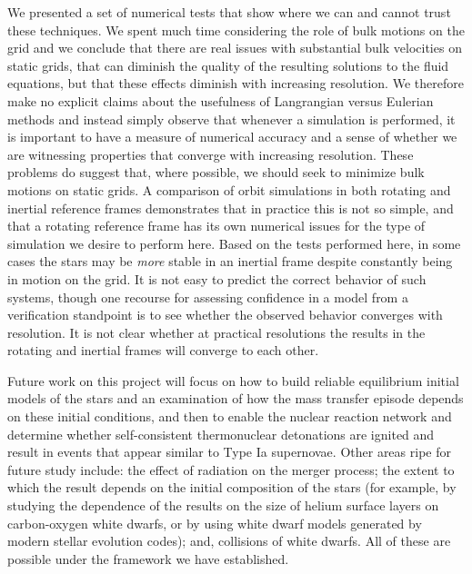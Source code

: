 \documentclass[iop]{../emulateapj}
\begin{document}
We presented a set of numerical tests that show where we can 
and cannot trust these techniques. We spent much time considering 
the role of bulk motions on the grid and we conclude that there 
are real issues with substantial bulk velocities on static grids, 
that can diminish the quality of the resulting solutions to the 
fluid equations, but that these effects diminish with increasing 
resolution. We therefore make no explicit claims about the usefulness 
of Langrangian versus Eulerian methods and instead simply observe 
that whenever a simulation is performed, it is important to have 
a measure of numerical accuracy and a sense of whether we are 
witnessing properties that converge with increasing resolution.
These problems do suggest that, where possible, we should seek to 
minimize bulk motions on static grids. A comparison of orbit 
simulations in both rotating and inertial reference frames 
demonstrates that in practice this is not so simple, and that 
a rotating reference frame has its own numerical issues for 
the type of simulation we desire to perform here. Based on 
the tests performed here, in some cases the stars may be 
\textit{more} stable in an inertial frame despite 
constantly being in motion on the grid. It 
is not easy to predict the correct behavior of such systems, 
though one recourse for assessing confidence in a model from a 
verification standpoint is to see whether the observed 
behavior converges with resolution. It is not clear 
whether at practical resolutions the results in the 
rotating and inertial frames will converge to each other.

Future work on this project will focus on how to build 
reliable equilibrium initial models of the stars and 
an examination of how the mass transfer episode depends on 
these initial conditions, and then to enable the nuclear 
reaction network and determine whether self-consistent 
thermonuclear detonations are ignited and result in 
events that appear similar to Type Ia supernovae. Other 
areas ripe for future study include: the effect of radiation 
on the merger process; the extent to which the result 
depends on the initial composition of the stars (for example, 
by studying the dependence of the results on the size of helium 
surface layers on carbon-oxygen white dwarfs, or by using 
white dwarf models generated by modern stellar evolution 
codes); and, collisions of white dwarfs. All of 
these are possible under the framework we have established.

\acknowledgments
\end{document}
